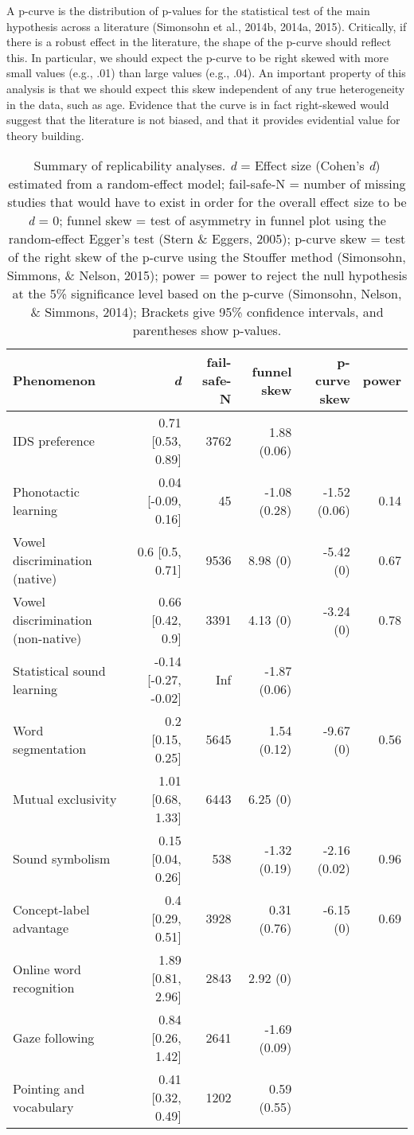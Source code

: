 \documentclass[english,floatsintext,man]{apa6}
\begin{document}
A p-curve is the distribution of p-values for the statistical test of
the main hypothesis across a literature (Simonsohn et al., 2014b, 2014a,
2015). Critically, if there is a robust effect in the literature, the
shape of the p-curve should reflect this. In particular, we should
expect the p-curve to be right skewed with more small values (e.g., .01)
than large values (e.g., .04). An important property of this analysis is
that we should expect this skew independent of any true heterogeneity in
the data, such as age. Evidence that the curve is in fact right-skewed
would suggest that the literature is not biased, and that it provides
evidential value for theory building.

\begin{table}[t]
\footnotesize
\begin{tabular}{lrrrrr}
\toprule
\textbf{Phenomenon}& \textbf{\textit{d}} & \textbf{fail-safe-N} & \textbf{funnel skew} & \textbf{p-curve skew} & \textbf{power}\\
\midrule
IDS preference & 0.71 [0.53, 0.89] & 3762 & 1.88 (0.06) &  & \\
Phonotactic learning & 0.04 [-0.09, 0.16] & 45 & -1.08 (0.28) & -1.52 (0.06) & 0.14\\
Vowel discrimination (native) & 0.6 [0.5, 0.71] & 9536 & 8.98 (0) & -5.42 (0) & 0.67\\
Vowel discrimination (non-native) & 0.66 [0.42, 0.9] & 3391 & 4.13 (0) & -3.24 (0) & 0.78\\
Statistical sound learning & -0.14 [-0.27, -0.02] & Inf & -1.87 (0.06) &  & \\
Word segmentation & 0.2 [0.15, 0.25] & 5645 & 1.54 (0.12) & -9.67 (0) & 0.56\\
Mutual exclusivity & 1.01 [0.68, 1.33] & 6443 & 6.25 (0) &  & \\
Sound symbolism & 0.15 [0.04, 0.26] & 538 & -1.32 (0.19) & -2.16 (0.02) & 0.96\\
Concept-label advantage & 0.4 [0.29, 0.51] & 3928 & 0.31 (0.76) & -6.15 (0) & 0.69\\
Online word recognition & 1.89 [0.81, 2.96] & 2843 & 2.92 (0) &  & \\
Gaze following & 0.84 [0.26, 1.42] & 2641 & -1.69 (0.09) &  & \\
Pointing and vocabulary & 0.41 [0.32, 0.49] & 1202 & 0.59 (0.55) &  & \\
\bottomrule
\end{tabular}
\caption{Summary of replicability analyses. \textit{d} = Effect size (Cohen's {\it d}) estimated from a random-effect model; fail-safe-N = number of missing studies that would have to exist in order for the overall effect size to be {\it d} = 0; funnel skew = test of asymmetry in funnel plot using the random-effect Egger's test (Stern \& Eggers, 2005); p-curve skew = test of the right skew of the p-curve using the Stouffer method (Simonsohn, Simmons, \& Nelson, 2015); power = power to reject the null hypothesis at the 5\% significance level based on the p-curve (Simonsohn, Nelson, \& Simmons, 2014);  Brackets give 95\% confidence intervals, and parentheses show p-values.}
\end{table}
\end{document}
